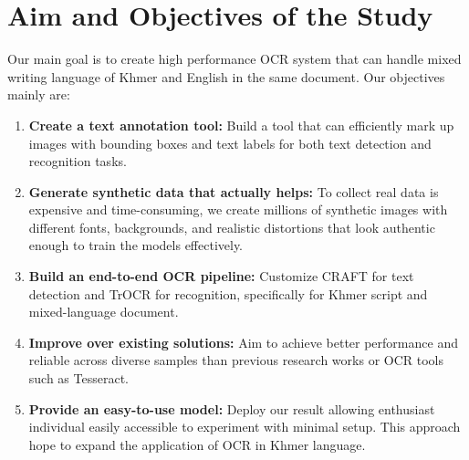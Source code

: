 \section{Aim and Objectives of the Study}
\label{sec:objectives}

Our main goal is to create high performance OCR system 
that can handle mixed writing language of Khmer and 
English in the same document. Our objectives mainly are:

\begin{enumerate}
    \item \textbf{Create a text annotation tool:} Build a tool that can efficiently mark up images with bounding boxes and text labels for both text detection and recognition tasks.

    \item \textbf{Generate synthetic data that actually helps:} To collect real data is expensive and time-consuming, we create millions of synthetic images with different fonts, backgrounds, and realistic distortions that look authentic enough to train the models effectively.

    \item \textbf{Build an end-to-end OCR pipeline:} Customize CRAFT for text detection and TrOCR for recognition, specifically for Khmer script and mixed-language document.

    \item \textbf{Improve over existing solutions:} Aim to achieve better performance and reliable across diverse samples than previous research works or OCR tools such as Tesseract.
    
    \item \textbf{Provide an easy-to-use model:} Deploy our result allowing enthusiast individual easily accessible to experiment with minimal setup. This approach hope to expand the application of OCR in Khmer language.
\end{enumerate}


